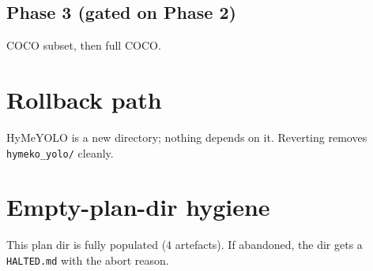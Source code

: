 \documentclass[11pt,a4paper]{article}
\begin{document}
\subsection*{Phase 3 (gated on Phase 2)}
COCO subset, then full COCO.

\section{Rollback path}
HyMeYOLO is a new directory; nothing depends on it.  Reverting
removes \texttt{hymeko\_yolo/} cleanly.

\section{Empty-plan-dir hygiene}
This plan dir is fully populated (4 artefacts).  If abandoned, the
dir gets a \texttt{HALTED.md} with the abort reason.
\end{document}
